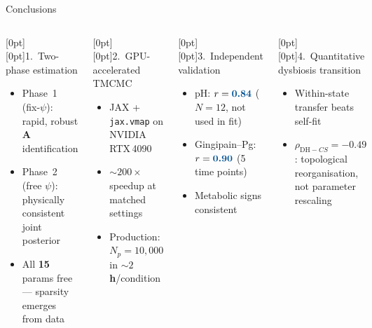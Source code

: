 \documentclass[aspectratio=169,10pt]{beamer}
\newcommand{\hlnum}[1]{\textcolor{ikm}{\textbf{#1}}}
\begin{document}
\begin{frame}[t]{Conclusions}
  \small
  \begin{columns}[T]
      \begin{block}{\raisebox{0pt}[0pt][0pt]{1.\ Two-phase estimation}}
        \begin{itemize}\setlength{\itemsep}{2pt}
          \item Phase~1 (fix-$\psi$): rapid, robust $\mathbf{A}$ identification
          \item Phase~2 (free $\psi$): physically consistent joint posterior
          \item All \hlnum{15} params free — sparsity emerges from data
        \end{itemize}
      \end{block}
      \vspace{5pt}
      \begin{block}{\raisebox{0pt}[0pt][0pt]{2.\ GPU-accelerated TMCMC}}
        \begin{itemize}\setlength{\itemsep}{2pt}
          \item JAX + \texttt{jax.vmap} on NVIDIA RTX\,4090
          \item \hlnum{${\sim}200\times$} speedup at matched settings
          \item Production: $N_p=10{,}000$ in \hlnum{${\sim}2$\,h}/condition
        \end{itemize}
      \end{block}
      \begin{block}{\raisebox{0pt}[0pt][0pt]{3.\ Independent validation}}
        \begin{itemize}\setlength{\itemsep}{2pt}
          \item pH: $r=\hlnum{0.84}$ ($N=12$, not used in fit)
          \item Gingipain--Pg: $r=\hlnum{0.90}$ (5 time points)
          \item Metabolic signs consistent
        \end{itemize}
      \end{block}
      \vspace{5pt}
      \begin{block}{\raisebox{0pt}[0pt][0pt]{4.\ Quantitative dysbiosis transition}}
        \begin{itemize}\setlength{\itemsep}{2pt}
          \item Within-state transfer beats self-fit
          \item $\rho_{\mathrm{DH}-CS}=-0.49$: topological reorganisation,\\
                not parameter rescaling
        \end{itemize}
      \end{block}
  \end{columns}
\end{frame}
\end{document}
